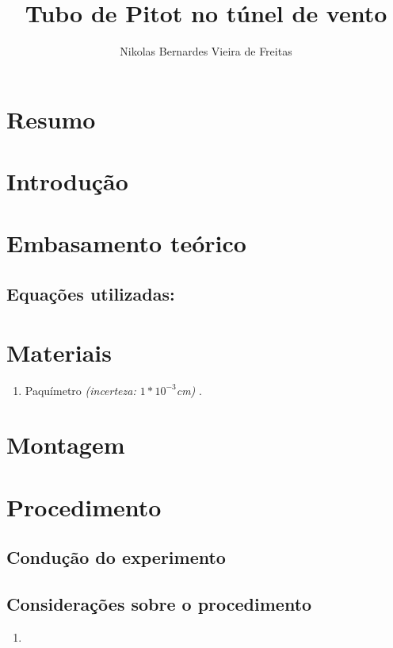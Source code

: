 \documentclass[a4paper]{article}
\title{Tubo de Pitot no túnel de vento}
\author{Nikolas Bernardes Vieira de Freitas}
\begin{document}
\maketitle

\section{Resumo}


\section{Introdução}

\section{Embasamento teórico}

\subsection*{Equações utilizadas:}
    {

    }

\section{Materiais}
    \begin{enumerate}[label=(\roman*)]
        \item Paquímetro \textit{ (incerteza: $1 * 10^{-3}$cm) }.
    \end{enumerate}

\section{Montagem}


\section{Procedimento}

\subsection{Condução do experimento}

 \subsection{Considerações sobre o procedimento}
  \begin{enumerate}
      \item
  \end{enumerate}
\end{document}
